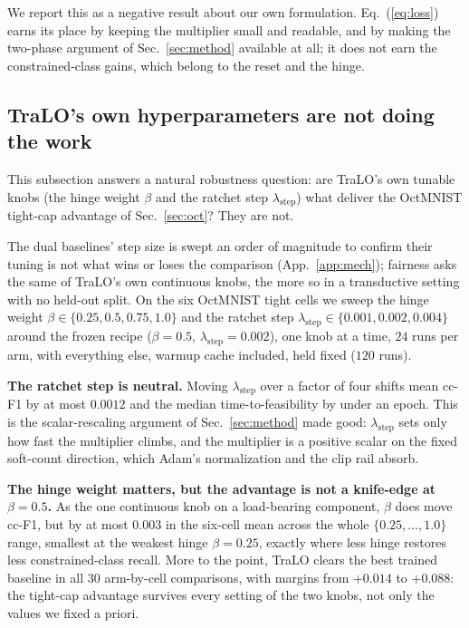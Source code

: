 \documentclass[10pt]{article}
\begin{document}
We report this as a negative result about our own formulation.
Eq.~(\ref{eq:loss}) earns its place by keeping the multiplier small and
readable, and by making the two-phase argument of Sec.~\ref{sec:method}
available at all; it does not earn the constrained-class gains, which
belong to the reset and the hinge.

\subsection{TraLO's own hyperparameters are not doing the work}
\label{app:tralo-sweep}

This subsection answers a natural robustness question: are TraLO's own
tunable knobs (the hinge weight $\beta$ and the ratchet step
$\lambda_{\text{step}}$) what deliver the OctMNIST tight-cap advantage
of Sec.~\ref{sec:oct}? They are not.

The dual baselines' step size is swept an order of magnitude to confirm
their tuning is not what wins or loses the comparison
(App.~\ref{app:mech}); fairness asks the same of TraLO's own
continuous knobs, the more so in a transductive setting with no
held-out split. On the six OctMNIST tight cells we sweep the hinge
weight $\beta\in\{0.25,0.5,0.75,1.0\}$ and the ratchet step
$\lambda_{\text{step}}\in\{0.001,0.002,0.004\}$ around the frozen
recipe ($\beta{=}0.5$, $\lambda_{\text{step}}{=}0.002$), one knob at a
time, $24$ runs per arm, with everything else, warmup cache included,
held fixed ($120$ runs).

\textbf{The ratchet step is neutral.} Moving $\lambda_{\text{step}}$
over a factor of four shifts mean cc-F1 by at most $0.0012$ and the
median time-to-feasibility by under an epoch. This is the
scalar-rescaling argument of Sec.~\ref{sec:method} made good:
$\lambda_{\text{step}}$ sets only how fast the multiplier climbs, and
the multiplier is a positive scalar on the fixed soft-count direction,
which Adam's normalization and the clip rail absorb.

\textbf{The hinge weight matters, but the advantage is not a
knife-edge at $\beta{=}0.5$.} As the one continuous knob on a
load-bearing component, $\beta$ does move cc-F1, but by at most $0.003$
in the six-cell mean across the whole $\{0.25,\dots,1.0\}$ range,
smallest at the weakest hinge $\beta{=}0.25$, exactly where less hinge
restores less constrained-class recall. More to the point, TraLO
clears the best trained baseline in all $30$ arm-by-cell comparisons,
with margins from $+0.014$ to $+0.088$: the tight-cap advantage
survives every setting of the two knobs, not only the values we fixed
a priori.
\end{document}
